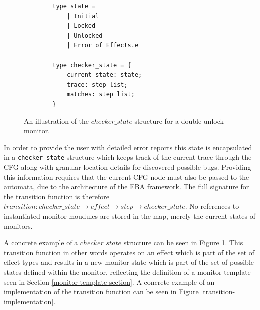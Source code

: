 \begin{figure}[H]
    \centering
    \begin{verbatim}
        type state = 
            | Initial
            | Locked
            | Unlocked
            | Error of Effects.e
	
        type checker_state = {
            current_state: state;
            trace: step list;
            matches: step list;
        }
    \end{verbatim}
    \caption{An illustration of the $checker\_state$ structure for a double-unlock monitor.}
    \label{checker-state}
\end{figure}

\newpar In order to provide the user with detailed error reports this state is encapsulated in a \texttt{checker state} structure which keeps track of the current trace through the CFG along with granular location details for discovered possible bugs. Providing this information requires that the current CFG node must also be passed to the automata, due to the architecture of the EBA framework. The full signature for the transition function is therefore $transition: \mathit{checker\_state} \rightarrow \mathit{effect} \rightarrow \mathit{step} \rightarrow \mathit{checker\_state}$. No references to instantiated monitor moudules are stored in the map, merely the current states of monitors. 

\newpar A concrete example of a $checker\_state$ structure can be seen in Figure \ref{checker-state}. This transition function in other words operates on an effect which is part of the set of effect types and results in a new monitor state which is part of the set of possible states defined within the monitor, reflecting the definition of a monitor template seen in Section \ref{monitor-template-section}. A concrete example of an implementation of the transition function can be seen in Figure \ref{transition-implementation}. 


